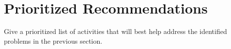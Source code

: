 \section{Prioritized Recommendations}

Give a prioritized list of activities that will best help address the identified problems in the previous section. 